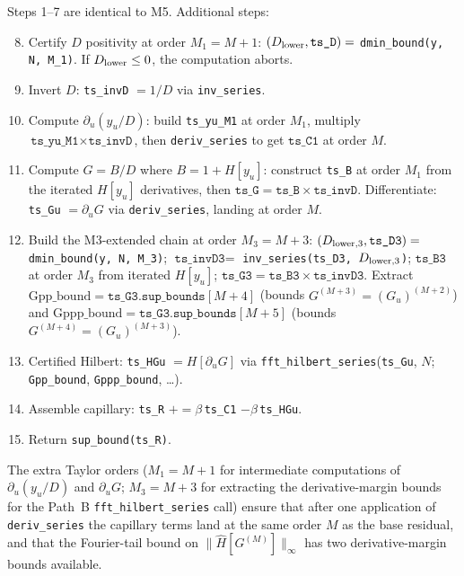 \documentclass[11pt]{article}
\theoremstyle{definition}
\begin{document}
Steps 1--7 are identical to M5.  Additional steps:
\begin{enumerate}
  \setcounter{enumi}{7}
  \item Certify $D$ positivity at order $M_1 = M+1$:
        $(D_{\rm lower}, \texttt{ts\_D}) =$ \texttt{dmin\_bound(y, N, M\_1)}.
        If $D_{\rm lower}\leq 0$, the computation aborts.
  \item Invert $D$: \texttt{ts\_invD} $= 1/D$ via \texttt{inv\_series}.
  \item Compute $\partial_u(y_u/D)$: build \texttt{ts\_yu\_M1} at order $M_1$,
        multiply $\texttt{ts\_yu\_M1}\times\texttt{ts\_invD}$, then
        \texttt{deriv\_series} to get $\texttt{ts\_C1}$ at order $M$.
  \item Compute $G = B/D$ where $B = 1 + H[y_u]$: construct \texttt{ts\_B}
        at order $M_1$ from the iterated $H[y_u]$ derivatives, then
        $\texttt{ts\_G} = \texttt{ts\_B}\times\texttt{ts\_invD}$.
        Differentiate: \texttt{ts\_Gu} $= \partial_u G$ via \texttt{deriv\_series},
        landing at order $M$.
  \item Build the M3-extended chain at order $M_3 = M+3$:
        $(D_{\rm lower,3}, \texttt{ts\_D3}) =$ \texttt{dmin\_bound(y, N, M\_3)};
        $\texttt{ts\_invD3} =$ \texttt{inv\_series(ts\_D3, $D_{\rm lower,3}$)};
        $\texttt{ts\_B3}$ at order $M_3$ from iterated $H[y_u]$;
        $\texttt{ts\_G3} = \texttt{ts\_B3}\times\texttt{ts\_invD3}$.
        Extract
        $\mathrm{Gpp\_bound} = \texttt{ts\_G3.sup\_bounds}[M{+}4]$ (bounds
        $G^{(M+3)} = (G_u)^{(M+2)}$) and
        $\mathrm{Gppp\_bound} = \texttt{ts\_G3.sup\_bounds}[M{+}5]$ (bounds
        $G^{(M+4)} = (G_u)^{(M+3)}$).
  \item Certified Hilbert: \texttt{ts\_HGu} $= H[\partial_u G]$ via
        \texttt{fft\_hilbert\_series}(\texttt{ts\_Gu}, $N$;
        \texttt{Gpp\_bound}, \texttt{Gppp\_bound}, \ldots).
  \item Assemble capillary: \texttt{ts\_R} $\mathrel{+}= \beta\,$\texttt{ts\_C1}
        $- \beta\,$\texttt{ts\_HGu}.
  \item Return \texttt{sup\_bound(ts\_R)}.
\end{enumerate}

The extra Taylor orders ($M_1 = M+1$ for intermediate computations of
$\partial_u(y_u/D)$ and $\partial_u G$; $M_3 = M+3$ for extracting the
derivative-margin bounds for the Path~B \texttt{fft\_hilbert\_series} call)
ensure that after one application of \texttt{deriv\_series} the capillary
terms land at the same order $M$ as the base residual, and that the
Fourier-tail bound on $\|\hat H[G^{(M)}]\|_\infty$ has two derivative-margin
bounds available.
\end{document}
